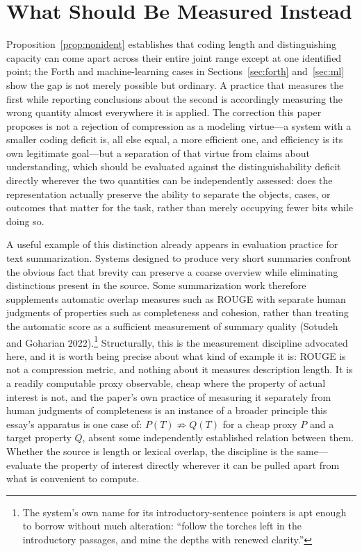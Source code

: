 \documentclass[11pt]{article}
\theoremstyle{plain}
\begin{document}
\section{What Should Be Measured Instead}
\label{sec:conclusion}

Proposition~\ref{prop:nonident} establishes that coding length and distinguishing capacity can come apart across their entire joint range except at one identified point; the Forth and machine-learning cases in Sections~\ref{sec:forth} and~\ref{sec:ml} show the gap is not merely possible but ordinary. A practice that measures the first while reporting conclusions about the second is accordingly measuring the wrong quantity almost everywhere it is applied. The correction this paper proposes is not a rejection of compression as a modeling virtue---a system with a smaller coding deficit is, all else equal, a more efficient one, and efficiency is its own legitimate goal---but a separation of that virtue from claims about understanding, which should be evaluated against the distinguishability deficit directly wherever the two quantities can be independently assessed: does the representation actually preserve the ability to separate the objects, cases, or outcomes that matter for the task, rather than merely occupying fewer bits while doing so.

A useful example of this distinction already appears in evaluation practice for text summarization. Systems designed to produce very short summaries confront the obvious fact that brevity can preserve a coarse overview while eliminating distinctions present in the source. Some summarization work therefore supplements automatic overlap measures such as ROUGE with separate human judgments of properties such as completeness and cohesion, rather than treating the automatic score as a sufficient measurement of summary quality (Sotudeh and Goharian 2022).\footnote{The system's own name for its introductory-sentence pointers is apt enough to borrow without much alteration: ``follow the torches left in the introductory passages, and mine the depths with renewed clarity.''} Structurally, this is the measurement discipline advocated here, and it is worth being precise about what kind of example it is: ROUGE is not a compression metric, and nothing about it measures description length. It is a readily computable proxy observable, cheap where the property of actual interest is not, and the paper's own practice of measuring it separately from human judgments of completeness is an instance of a broader principle this essay's apparatus is one case of: $P(T) \not\Rightarrow Q(T)$ for a cheap proxy $P$ and a target property $Q$, absent some independently established relation between them. Whether the source is length or lexical overlap, the discipline is the same---evaluate the property of interest directly wherever it can be pulled apart from what is convenient to compute.
\end{document}
